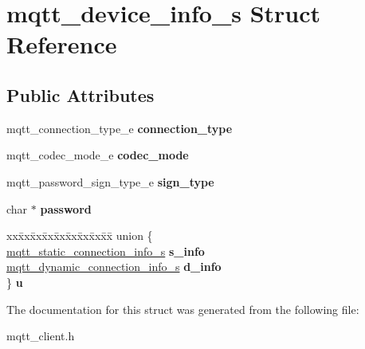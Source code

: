 \hypertarget{structmqtt__device__info__s}{}\section{mqtt\+\_\+device\+\_\+info\+\_\+s Struct Reference}
\label{structmqtt__device__info__s}
\subsection*{Public Attributes}
\begin{DoxyCompactItemize}
\item 
\mbox{\label{structmqtt__device__info__s_ab013a30040bc05020c3855fb99412079}} 
mqtt\+\_\+connection\+\_\+type\+\_\+e {\bfseries connection\+\_\+type}
\item 
\mbox{\label{structmqtt__device__info__s_a655e7ba693ddceacbbad11f54369a332}} 
mqtt\+\_\+codec\+\_\+mode\+\_\+e {\bfseries codec\+\_\+mode}
\item 
\mbox{\label{structmqtt__device__info__s_afe093ffa0b90346e73303a95d7f9eed0}} 
mqtt\+\_\+password\+\_\+sign\+\_\+type\+\_\+e {\bfseries sign\+\_\+type}
\item 
\mbox{\label{structmqtt__device__info__s_a5c314b0b528d3208bc8937de1d9c5bc6}} 
char $\ast$ {\bfseries password}
\item 
\mbox{\label{structmqtt__device__info__s_a919619fb344fdd096a7ab0cd47cb24e6}} 
\begin{tabbing}
xx\=xx\=xx\=xx\=xx\=xx\=xx\=xx\=xx\=\kill
union \{\\
\>\mbox{\hyperlink{structmqtt__static__connection__info__s}{mqtt\_static\_connection\_info\_s}} {\bfseries s\_info}\\
\>\mbox{\hyperlink{structmqtt__dynamic__connection__info__s}{mqtt\_dynamic\_connection\_info\_s}} {\bfseries d\_info}\\
\} {\bfseries u}\\

\end{tabbing}\end{DoxyCompactItemize}


The documentation for this struct was generated from the following file\+:\begin{DoxyCompactItemize}
\item 
mqtt\+\_\+client.\+h\end{DoxyCompactItemize}

